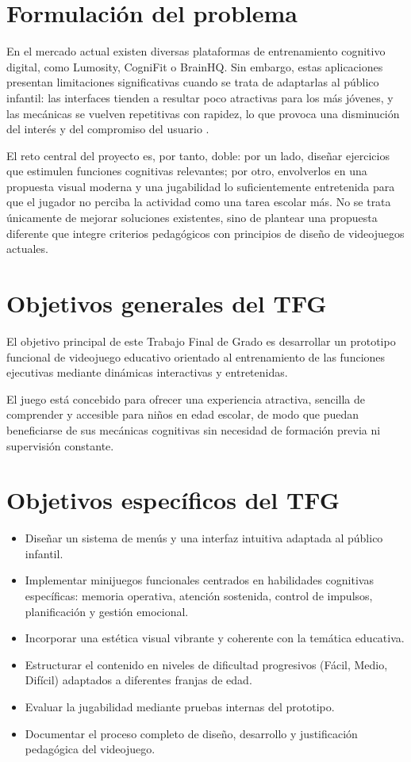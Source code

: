 \documentclass[12pt, a4paper]{report}
\begin{document}
\section{Formulación del problema}

En el mercado actual existen diversas plataformas de entrenamiento cognitivo
digital, como Lumosity, CogniFit o BrainHQ. Sin embargo, estas aplicaciones
presentan limitaciones significativas cuando se trata de adaptarlas al público
infantil: las interfaces tienden a resultar poco atractivas para los más jóvenes,
y las mecánicas se vuelven repetitivas con rapidez, lo que provoca una disminución
del interés y del compromiso del usuario \citep{Wouters2013,Boyle2016}.

El reto central del proyecto es, por tanto, doble: por un lado, diseñar ejercicios
que estimulen funciones cognitivas relevantes; por otro, envolverlos en una
propuesta visual moderna y una jugabilidad lo suficientemente entretenida para
que el jugador no perciba la actividad como una tarea escolar más. No se trata
únicamente de mejorar soluciones existentes, sino de plantear una propuesta
diferente que integre criterios pedagógicos con principios de diseño de
videojuegos actuales.

\section{Objetivos generales del TFG}

El objetivo principal de este Trabajo Final de Grado es desarrollar un prototipo
funcional de videojuego educativo orientado al entrenamiento de las funciones
ejecutivas mediante dinámicas interactivas y entretenidas.

El juego está concebido para ofrecer una experiencia atractiva, sencilla de
comprender y accesible para niños en edad escolar, de modo que puedan
beneficiarse de sus mecánicas cognitivas sin necesidad de formación previa
ni supervisión constante.

\section{Objetivos específicos del TFG}

\begin{itemize}
  \item Diseñar un sistema de menús y una interfaz intuitiva adaptada al
    público infantil.
  \item Implementar minijuegos funcionales centrados en habilidades cognitivas
    específicas: memoria operativa, atención sostenida, control de impulsos,
    planificación y gestión emocional.
  \item Incorporar una estética visual vibrante y coherente con la temática
    educativa.
  \item Estructurar el contenido en niveles de dificultad progresivos
    (Fácil, Medio, Difícil) adaptados a diferentes franjas de edad.
  \item Evaluar la jugabilidad mediante pruebas internas del prototipo.
  \item Documentar el proceso completo de diseño, desarrollo y justificación
    pedagógica del videojuego.
\end{itemize}
\end{document}
